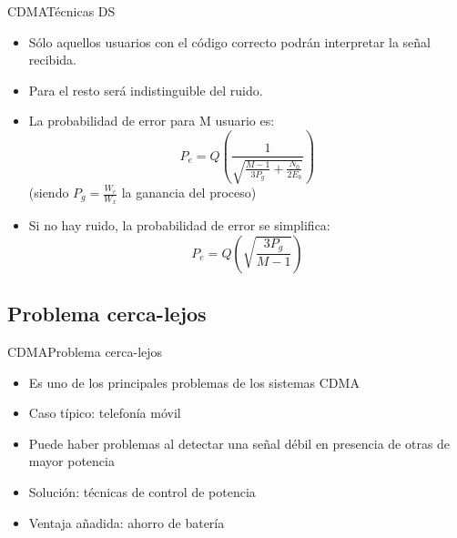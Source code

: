 \documentclass[10pt,compress]{beamer} %
\begin{document}
\begin{frame}{CDMA}{Técnicas DS}
  \begin{itemize}
    \item Sólo aquellos usuarios con el código correcto podrán interpretar la señal recibida.
    \item Para el resto será indistinguible del ruido.
    \item La probabilidad de error para M usuario es:\\
    \begin{displaymath}
      P_e = Q \left ( \frac{1}{\sqrt{\frac{M-1}{3P_g} + \frac{N_0}{2E_b}}} \right )
    \end{displaymath}
    (siendo $P_g = \frac{W_c}{W_x}$ la ganancia del proceso)

    \item Si no hay ruido, la probabilidad de error se simplifica:
    \begin{displaymath}
      P_e = Q \left ( \sqrt{\frac{3P_g}{M-1}} \right )
    \end{displaymath}
  \end{itemize}
\end{frame}

\subsection{Problema cerca-lejos}
\begin{frame}{CDMA}{Problema cerca-lejos}
  \begin{itemize}
    \item Es uno de los principales problemas de los sistemas CDMA
    \item Caso típico: telefonía móvil
    \item Puede haber problemas al detectar una señal débil en presencia de otras de mayor potencia
    \item Solución: técnicas de control de potencia
    \item Ventaja añadida: ahorro de batería
  \end{itemize}
\end{frame}
\end{document}
